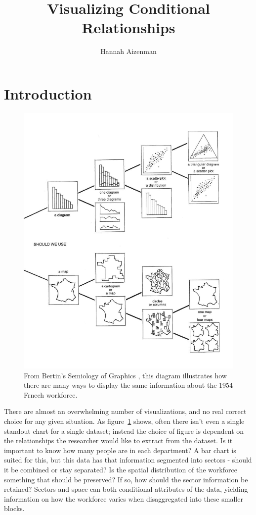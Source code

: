 \documentclass[letterpaper,onecolumn,titlepage]{Ythesis}
\title{Visualizing Conditional Relationships}
\author{Hannah Aizenman}
\begin{document}
\makefrontmatter

\section{Introduction}
\label{sec:introduction}
\begin{figure}
  \includegraphics{chart_chooser}
  \caption{From Bertin's Semiology of Graphics \cite{bertin}, this diagram
    illustrates how there are many ways to display the same information about the 1954 Frnech
  workforce.}
  \label{fig:chart_chooser}
\end{figure}

There are almost an overwhelming number of visualizations, and no real correct
choice for any given situation. As figure~\ref{fig:chart_chooser} shows, often
there isn't even a single standout chart for a single dataset; instead the
choice of figure is dependent on the relationships the researcher would like to
extract from the dataset. Is it important to know how many people are in each
department? A bar chart is suited for this, but this data has that information
segmented into sectors - should it be combined or stay separated? Is the
spatial distribution of the workforce something that should be preserved? If
so, how should the sector information be retained? Sectors and space can both
conditional attributes of the data, yielding information on how the workforce
varies when disaggregated into these smaller blocks.
\end{document}
